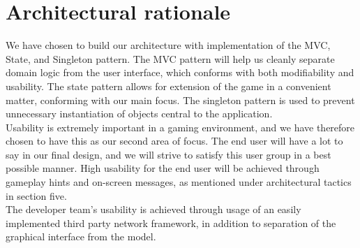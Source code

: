 \section{Architectural rationale}

We have chosen to build our architecture with implementation of the MVC, State, and Singleton pattern. The MVC pattern will help us cleanly separate domain logic from the user interface, which conforms with both modifiability and usability. The state pattern allows for extension of the game in a convenient matter, conforming with our main focus. The singleton pattern is used to prevent unnecessary instantiation of objects central to the application. \\

Usability is extremely important in a gaming environment, and we have therefore chosen to have this as our second area of focus. The end user will have a lot to say in our final design, and we will strive to satisfy this user group in a best possible manner. High usability for the end user will be achieved through gameplay hints and on-screen messages, as mentioned under architectural tactics in section five. \\

The developer team's usability is achieved through usage of an easily implemented third party network framework, in addition to separation of the graphical interface from the model.